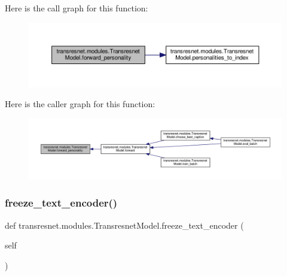 Here is the call graph for this function\+:
\nopagebreak
\begin{figure}[H]
\begin{center}
\leavevmode
\includegraphics[width=350pt]{classtransresnet_1_1modules_1_1TransresnetModel_aa3f65819701999860b414e1bb6bf74cb_cgraph}
\end{center}
\end{figure}
Here is the caller graph for this function\+:
\nopagebreak
\begin{figure}[H]
\begin{center}
\leavevmode
\includegraphics[width=350pt]{classtransresnet_1_1modules_1_1TransresnetModel_aa3f65819701999860b414e1bb6bf74cb_icgraph}
\end{center}
\end{figure}
\mbox{\label{classtransresnet_1_1modules_1_1TransresnetModel_aaa175ffaf6daa6348a2c5479f38be530}} 
\subsubsection{\texorpdfstring{freeze\+\_\+text\+\_\+encoder()}{freeze\_text\_encoder()}}
{\footnotesize\ttfamily def transresnet.\+modules.\+Transresnet\+Model.\+freeze\+\_\+text\+\_\+encoder (\begin{DoxyParamCaption}\item[{}]{self }\end{DoxyParamCaption})}

